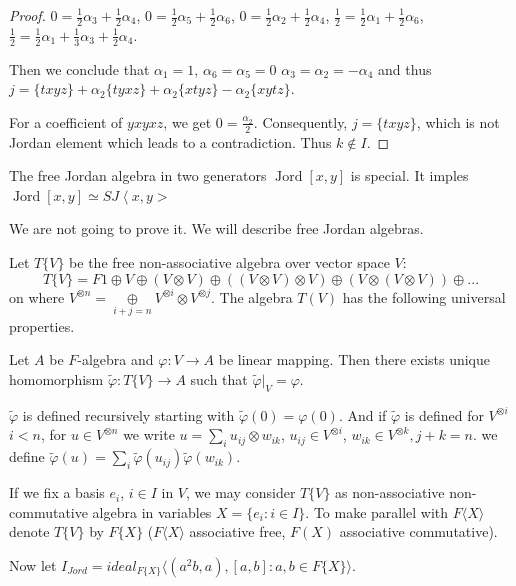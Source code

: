 \documentclass{article}
\def\<{\mathop{\langle}}
\begin{document}
\begin{proof}
$0 = \frac{1}{2} \alpha_3 + \frac{1}{2} \alpha_4$, $0 = \frac{1}{2} \alpha_5 + \frac{1}{2} \alpha_6$, $0 = \frac{1}{2} \alpha_2 + \frac{1}{2} \alpha_4$, $\frac{1}{2} = \frac{1}{2} \alpha_1 + \frac{1}{2} \alpha_6$, $\frac{1}{2} = \frac{1}{2} \alpha_1 + \frac{1}{3} \alpha_3 + \frac{1}{2} \alpha_4$.  

Then we conclude that $\alpha_1 = 1$, $\alpha_6 = \alpha_5 = 0$  
$\alpha_3 = \alpha_2 = - \alpha_4$ and thus $j = \{txyz\} + \alpha_2 \{tyxz\} + \alpha_2 \{xtyz\} - \alpha_2 \{xytz\} $.  

For a coefficient of $yxyxz$, we get $0 =  \frac{\alpha_2}{2}$.  
Consequently, $j = \{txyz\}$, which is not Jordan element which leads to a contradiction. Thus $k \notin I$.  
\end{proof}

\begin{theorem} 
The free Jordan algebra in two generators $\operatorname{Jord}[x, y]$ is special. It imples $ \operatorname{Jord}[x,y] \simeq SJ\< x,y> $ 
\end{theorem}
We are not going to prove it. We will describe free Jordan algebras.

Let $T\{V\}$ be the free non-associative algebra over vector space $V$:  
\[T\{V\} = F1 \oplus V \oplus (V \otimes V) \oplus ((V \otimes V) \otimes V) \oplus (V \otimes (V \otimes V)) \oplus ...\]  
on where $V^{\otimes n} = \underset{i+j = n}{\oplus} V^{\otimes i} \otimes V^{\otimes j}$. The algebra $T(V)$ has the following universal properties.  

Let $ A $ be $F$-algebra and $\varphi: V \to A$ be linear mapping. Then there exists unique homomorphism $\tilde{\varphi}: T\{V\} \to A$ such that $\tilde{\varphi}|_V = \varphi$.  

$\tilde{\varphi}$ is defined recursively starting with $\tilde{\varphi}(0) = \varphi(0)$. And if $\tilde{\varphi}$ is defined for $V^{\otimes i}$ $i < n$, for $u \in V^{\otimes n}$ we write $u = \sum_i u_{ij} \otimes w_{ik}$, $u_{ij} \in V^{\otimes i}$, $w_{ik} \in V^{\otimes k}, j+k=n$.  
we define $\tilde{\varphi}(u) = \sum_i \tilde{\varphi}(u_{ij}) \tilde{\varphi}(w_{ik})$.  

If we fix a basis $e_i$, $i \in I$ in $V$, we may consider $T\{V\}$ as non-associative non-commutative algebra in variables $X = \{e_i : i \in I\}$. To make parallel with $F \langle X \rangle$ denote $T\{V\}$ by $F\{X\}$ ($F\langle X \rangle$ associative free, $F(X)$ associative commutative).  

Now let $I_{Jord} = ideal_{F\{X\}} \langle (a^2 b, a), [a, b]: a, b \in F\{X\} \rangle$.  
\end{document}
